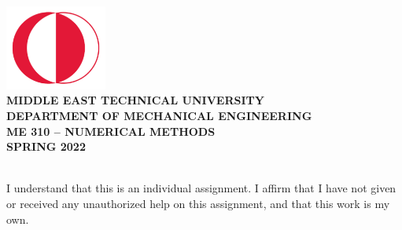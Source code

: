 \begin{titlepage}
   \begin{center}
       \includegraphics[width=0.25\textwidth]{img/metu.png}\\
       \vspace*{1cm}
       \Large
       \textbf{MIDDLE EAST TECHNICAL UNIVERSITY}\\
       \vspace{0.05cm}
       \textbf{DEPARTMENT OF MECHANICAL ENGINEERING}\\
       \vspace{1.2cm}
       \textbf{ME 310 – NUMERICAL METHODS}\\
       \textbf{SPRING 2022}\\
       \vspace{3cm}
       \\
       \vspace{2cm}

       \vfill
       
       \small
       I understand that this is an individual assignment. I affirm that I have not given or received
any unauthorized help on this assignment, and that this work is my own.
            
       \vspace{0cm}

            
   \end{center}
\end{titlepage}